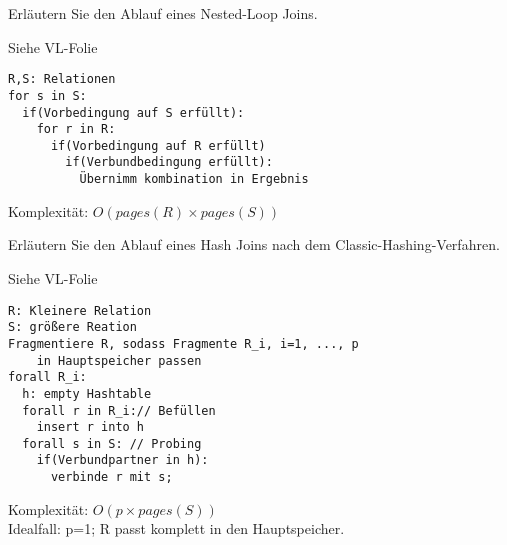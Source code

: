 \item Erläutern Sie den Ablauf eines Nested-Loop Joins.

\begin{solution}
Siehe VL-Folie~\NestedLoopJoin
\end{solution}

\cprotEnv
\begin{note}
\begin{lstlisting}
R,S: Relationen
for s in S:
  if(Vorbedingung auf S erfüllt):
    for r in R:
      if(Vorbedingung auf R erfüllt)
        if(Verbundbedingung erfüllt):
          Übernimm kombination in Ergebnis
\end{lstlisting}
Komplexität: $O(pages(R)\times pages(S))$
\end{note}

\item Erläutern Sie den Ablauf eines Hash Joins nach dem Classic-Hashing-Verfahren.

\begin{solution}
Siehe VL-Folie~\HashJoin
\end{solution}

\cprotEnv
\begin{note}
\begin{lstlisting}
R: Kleinere Relation
S: größere Reation
Fragmentiere R, sodass Fragmente R_i, i=1, ..., p 
	in Hauptspeicher passen
forall R_i:
  h: empty Hashtable
  forall r in R_i:// Befüllen
    insert r into h
  forall s in S: // Probing
    if(Verbundpartner in h):
      verbinde r mit s;
\end{lstlisting}
Komplexität: $O(p\times pages(S))$\\
Idealfall: p=1; R passt komplett in den Hauptspeicher.
\end{note}
